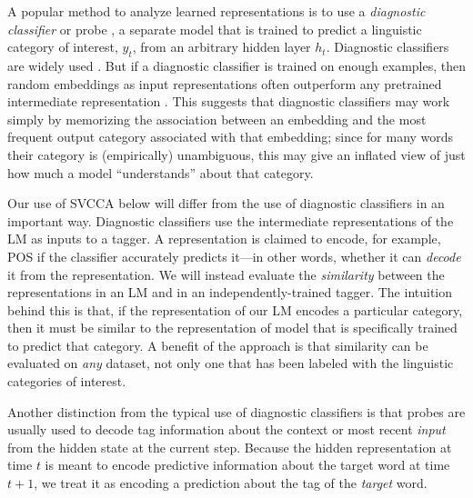 A popular method to analyze learned representations is to use a \emph{diagnostic classifier} \cite{belinkov_what_2017,hupkes2018visualisation} or probe \cite{conneau_what_2018}, a separate model that is trained to predict a linguistic category of interest, $y_t$, from an arbitrary hidden layer $h_t$. Diagnostic classifiers are widely used \cite{belinkov_evaluating_2018,giulianelli_under_2018}. But if a diagnostic classifier is trained on enough examples, then random embeddings as input representations often outperform any pretrained intermediate representation \cite{wieting2019no,zhang_language_2018}. This suggests that diagnostic classifiers may work simply by memorizing the association between an embedding and the most frequent output category associated with that embedding; since for many words their category is (empirically) unambiguous, this may give an inflated view of just how much a model ``understands'' about that category. 

Our use of SVCCA below will differ from the use of diagnostic classifiers in an important way.  Diagnostic classifiers use the intermediate representations of the LM as inputs to a tagger. A representation is claimed to encode, for example, POS if the classifier accurately predicts it---in other words, whether it can \emph{decode} it from the representation. We will instead evaluate the \textit{similarity} between the representations in an LM and in an independently-trained tagger. The intuition behind this is that, if the representation of our LM encodes a particular category, then it must be similar to the representation of model that is specifically trained to predict that category. A benefit of the approach is that similarity can be evaluated on \emph{any} dataset, not only one that has been labeled with the linguistic categories of interest.


Another distinction from the typical use of diagnostic classifiers  is that probes are  usually used to decode tag information about the context or most recent \textit{input} from the hidden state at the current step. Because the hidden representation at time $t$ is meant to encode predictive information about the target word at time $t+1$, we treat it as encoding a prediction about the tag of the \textit{target} word. 


